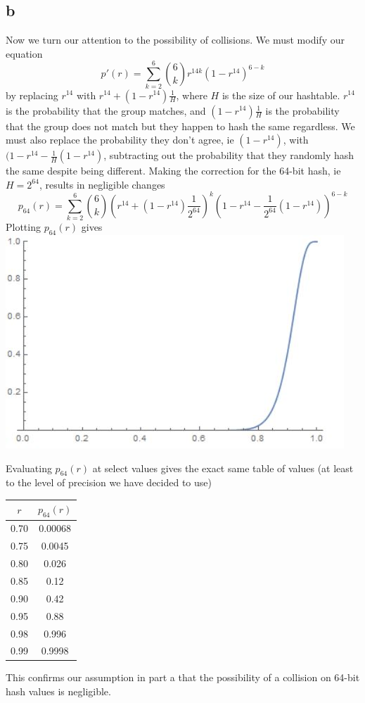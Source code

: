 \documentclass{article}
\begin{document}
\subsection*{b}
Now we turn our attention to the possibility of collisions. We must modify our equation
$$p'(r) = \sum\limits_{k=2}^6 {6 \choose k} r^{14k} (1-r^{14})^{6-k}$$
by replacing $r^{14}$ with $r^14 + (1-r^{14}) \frac{1}{H}$, where $H$ is the size of our hashtable. $r^14$ is the probability that the group matches, and $(1-r^{14}) \frac{1}{H}$ is the probability that the group does not match but they happen to hash the same regardless. We must also replace the probability they don't agree, ie $(1-r^{14})$, with $(1-r^{14} - \frac{1}{H}(1-r^{14})$, subtracting out the probability that they randomly hash the same despite being different. Making the correction for the 64-bit hash, ie $H = 2^{64}$, results in negligible changes
$$p_{64}(r) = \sum\limits_{k=2}^6 {6 \choose k} (r^{14} + (1-r^{14}) \frac{1}{2^{64}})^k (1-r^{14}-\frac{1}{2^{64}}(1-r^{14}))^{6-k}$$
Plotting $p_{64}(r)$ gives\\
\includegraphics[scale=0.8]{p64.jpg}

Evaluating $p_{64}(r)$ at select values gives the exact same table of values (at least to the level of precision we have decided to use)
\begin{center}
\begin{tabular}{ | c | c | }
\hline
$r$ & $p_{64}(r)$ \\
\hline\hline
0.70 & 0.00068 \\
\hline
0.75 & 0.0045\\
\hline
0.80 & 0.026\\
\hline
0.85 & 0.12\\
\hline
0.90 & 0.42\\
\hline
0.95 & 0.88\\
\hline
0.98 & 0.996 \\
\hline
0.99 & 0.9998 \\ 
\hline

\end{tabular}
\end{center}
This confirms our assumption in part a that the possibility of a collision on 64-bit hash values is negligible. 
\end{document}
